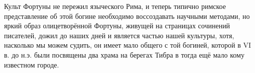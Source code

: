 Культ Фортуны не пережил языческого Рима, и теперь типично римское представление об этой богине необходимо воссоздавать научными методами, но яркий образ олицетворённой Фортуны, живущей на страницах сочинений писателей, дожил до наших дней и является частью нашей культуры, хотя, насколько мы можем судить, он имеет мало общего с той богиней, которой в VI в. до н.э. были посвящены два храма на берегах Тибра в тогда ещё мало кому известном городе.



